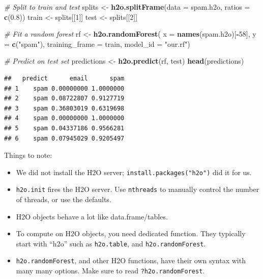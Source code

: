 \documentclass[]{book}
\newenvironment{Shaded}{\begin{snugshade}}{\end{snugshade}}
\newcommand{\CommentTok}[1]{\textcolor[rgb]{0.56,0.35,0.01}{\textit{#1}}}
\newcommand{\DataTypeTok}[1]{\textcolor[rgb]{0.13,0.29,0.53}{#1}}
\newcommand{\DecValTok}[1]{\textcolor[rgb]{0.00,0.00,0.81}{#1}}
\newcommand{\FloatTok}[1]{\textcolor[rgb]{0.00,0.00,0.81}{#1}}
\newcommand{\KeywordTok}[1]{\textcolor[rgb]{0.13,0.29,0.53}{\textbf{#1}}}
\newcommand{\NormalTok}[1]{#1}
\newcommand{\OperatorTok}[1]{\textcolor[rgb]{0.81,0.36,0.00}{\textbf{#1}}}
\newcommand{\StringTok}[1]{\textcolor[rgb]{0.31,0.60,0.02}{#1}}
\providecommand{\tightlist}{%
  \setlength{\itemsep}{0pt}\setlength{\parskip}{0pt}}
\theoremstyle{definition}
\theoremstyle{definition}
\theoremstyle{definition}
\theoremstyle{remark}
\begin{document}
\begin{Shaded}
\begin{Highlighting}[]
\CommentTok{# Split to train and test}
\NormalTok{splits <-}\StringTok{ }\KeywordTok{h2o.splitFrame}\NormalTok{(}\DataTypeTok{data =}\NormalTok{ spam.h2o, }\DataTypeTok{ratios =} \KeywordTok{c}\NormalTok{(}\FloatTok{0.8}\NormalTok{))}
\NormalTok{train <-}\StringTok{ }\NormalTok{splits[[}\DecValTok{1}\NormalTok{]]}
\NormalTok{test <-}\StringTok{ }\NormalTok{splits[[}\DecValTok{2}\NormalTok{]]}

\CommentTok{# Fit a random forest}
\NormalTok{rf <-}\StringTok{ }\KeywordTok{h2o.randomForest}\NormalTok{(}
  \DataTypeTok{x =} \KeywordTok{names}\NormalTok{(spam.h2o)[}\OperatorTok{-}\DecValTok{58}\NormalTok{],}
  \DataTypeTok{y =} \KeywordTok{c}\NormalTok{(}\StringTok{"spam"}\NormalTok{),}
  \DataTypeTok{training_frame =}\NormalTok{ train,}
  \DataTypeTok{model_id =} \StringTok{"our.rf"}\NormalTok{)}

\CommentTok{# Predict on test set}
\NormalTok{predictions <-}\StringTok{ }\KeywordTok{h2o.predict}\NormalTok{(rf, test)}
\KeywordTok{head}\NormalTok{(predictions)}
\end{Highlighting}
\end{Shaded}

\begin{verbatim}
##   predict      email      spam
## 1    spam 0.00000000 1.0000000
## 2    spam 0.08722807 0.9127719
## 3    spam 0.36803019 0.6319698
## 4    spam 0.00000000 1.0000000
## 5    spam 0.04337186 0.9566281
## 6    spam 0.07945029 0.9205497
\end{verbatim}

Things to note:

\begin{itemize}
\tightlist
\item
  We did not install the H2O server; \texttt{install.packages("h2o")} did it for us.
\item
  \texttt{h2o.init} fires the H2O server. Use \texttt{nthreads} to manually control the number of threads, or use the defaults.
\item
  H2O objects behave a lot like data.frame/tables.
\item
  To compute on H2O objects, you need dedicated function. They typically start with ``h2o'' such as \texttt{h2o.table}, and \texttt{h2o.randomForest}.
\item
  \texttt{h2o.randomForest}, and other H2O functions, have their own syntax with many many options. Make sure to read \texttt{?h2o.randomForest}.
\end{itemize}
\end{document}
